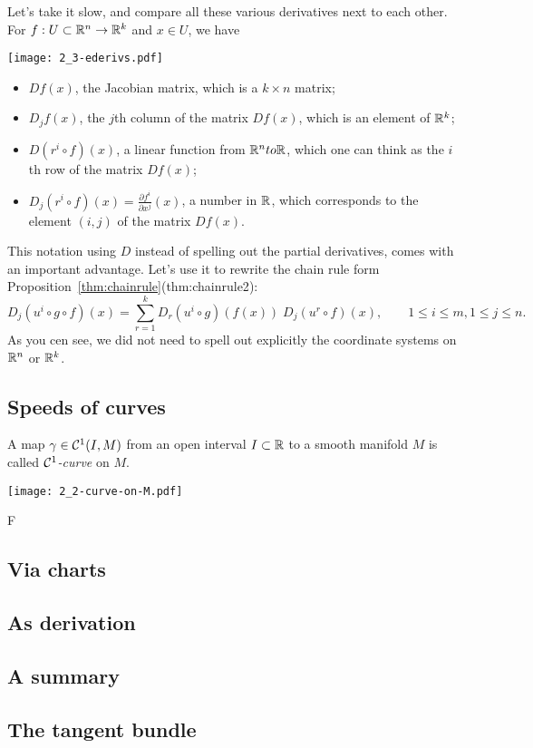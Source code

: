 Let's take it slow, and compare all these various derivatives next to each other.
For $f:U\subset\mathbb{R}^n\to\mathbb{R}^k$ and $x\in U$, we have
\begin{marginfigure}[3.5cm]
    \texttt{[image: 2\_3-ederivs.pdf]}
\end{marginfigure}
\begin{itemize}
    \item $Df(x)$, the Jacobian matrix, which is a $k\times n$ matrix;
    \item $D_j f(x)$, the $j$th column of the matrix $Df(x)$, which is an element of $\mathbb{R}^k$;
    \item $D(r^i\circ f)(x)$, a linear function from $\mathbb{R}^n to \mathbb{R}$, which one can think as the $i$th row of the matrix $Df(x)$;
    \item $D_j(r^i\circ f)(x) = \frac{\partial f^i}{\partial x^j}(x)$, a number in $\mathbb{R}$, which corresponds to the element $(i,j)$ of the matrix $Df(x)$.
\end{itemize}

This notation using $D$ instead of spelling out the partial derivatives, comes with an important advantage.
Let's use it to rewrite the chain rule form Proposition~\ref{thm:chainrule}({thm:chainrule2}):
\begin{equation}
    D_j(u^i\circ g \circ f) (x) = \sum_{r=1}^k D_r(u^i\circ g)(f(x))\; D_j(u^r \circ f)(x),
    \qquad
    1\leq i\leq m, 1\leq j \leq n.
\end{equation}
As you cen see, we did not need to spell out explicitly the coordinate systems on $\mathbb{R}^n$ or $\mathbb{R}^k$.

\subsection{Speeds of curves}

A map $\gamma\in\mathcal{C}^1(I, M)$ from an open interval $I\subset\mathbb{R}$ to a smooth manifold $M$ is called \emph{$\mathcal{C}^1$-curve} on $M$.
\begin{marginfigure}
  \texttt{[image: 2\_2-curve-on-M.pdf]}
\end{marginfigure}
F
\subsection{Via charts}
\subsection{As derivation}

\subsection{A summary}

\subsection{The tangent bundle}